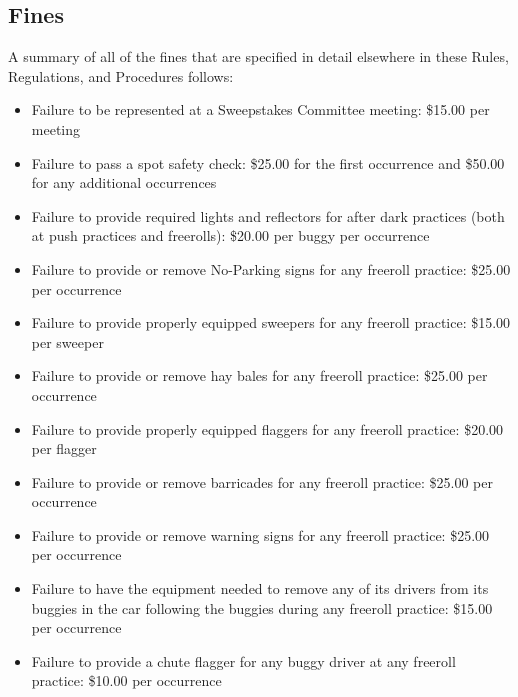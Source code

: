 \begin{appendices}
	\section{Fines}
		A summary of all of the fines that are specified in detail elsewhere in these
		Rules, Regulations, and Procedures follows:

		\begin{itemize}

			\item Failure to be represented at a Sweepstakes Committee meeting: \$15.00
			per meeting

			\item Failure to pass a spot safety check: \$25.00 for the first occurrence
			and \$50.00 for any additional occurrences

			\item Failure to provide required lights and reflectors for after dark
			practices (both at push practices and freerolls): \$20.00 per buggy per
			occurrence

			\item Failure to provide or remove No-Parking signs for any freeroll
			practice: \$25.00 per occurrence

			\item Failure to provide properly equipped sweepers for any freeroll
			practice: \$15.00 per sweeper

			\item Failure to provide or remove hay bales for any freeroll practice:
			\$25.00 per occurrence

			\item Failure to provide properly equipped flaggers for any freeroll
			practice: \$20.00 per flagger

			\item Failure to provide or remove barricades for any freeroll practice:
			\$25.00 per occurrence

			\item Failure to provide or remove warning signs for any freeroll practice:
			\$25.00 per occurrence

			\item Failure to have the equipment needed to remove any of its drivers
			from its buggies in the car following the buggies during any freeroll practice:
			\$15.00 per occurrence

			\item Failure to provide a chute flagger for any buggy driver at any
			freeroll practice: \$10.00 per occurrence


\end{itemize}
\end{appendices}
